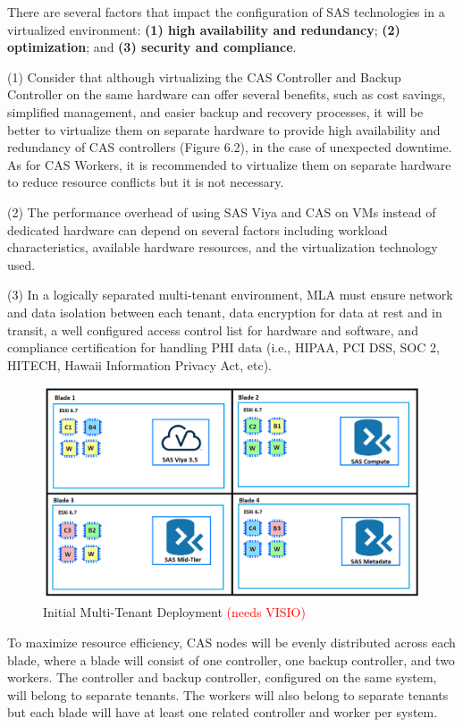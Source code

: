 There are several factors that impact the configuration of SAS technologies in a virtualized environment:  \textbf{(1) high availability and redundancy}; \textbf{(2) optimization}; and \textbf{(3) security and compliance}. 

(1) Consider that although virtualizing the CAS Controller and Backup Controller on the same hardware can offer several benefits, such as cost savings, simplified management, and easier backup and recovery processes, it will be better to virtualize them on separate hardware to provide high availability and redundancy of CAS controllers (Figure 6.2), in the case of unexpected downtime. As for CAS Workers, it is recommended to virtualize them on separate hardware to reduce resource conflicts but it is not necessary. 

(2) The performance overhead of using SAS Viya and CAS on VMs instead of dedicated hardware can depend on several factors including workload characteristics, available hardware resources, and the virtualization technology used.

(3) In a logically separated multi-tenant environment, MLA must ensure network and data isolation between each tenant, data encryption for data at rest and in transit, a well configured access control list for hardware and software, and compliance certification for handling PHI data (i.e., HIPAA, PCI DSS, SOC 2, HITECH, Hawaii Information Privacy Act, etc). 

\begin{figure}[H]
    \centering
    \includegraphics[scale = 0.52]{images/initial-deployment-diagram.png}
    \caption{Initial Multi-Tenant Deployment \textcolor{red}{(needs VISIO)} }
    \label{Initial Multi-Tenant Deployment}
\end{figure} 

To maximize resource efficiency, CAS nodes will be evenly distributed across each blade, where a blade will consist of one controller, one backup controller, and two workers. The controller and backup controller, configured on the same system, will belong to separate tenants. The workers will also belong to separate tenants but each blade will have at least one related controller and worker per system. 

